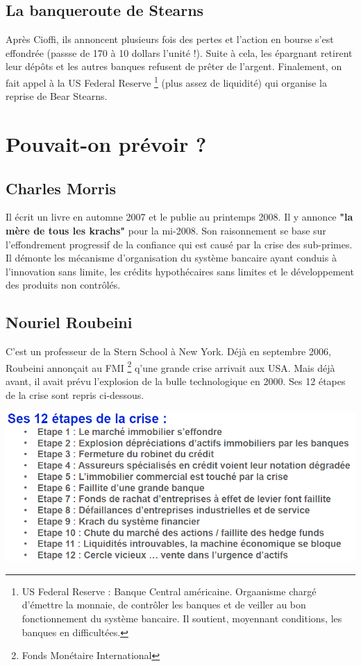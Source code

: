 \subsection{La banqueroute de Stearns}
Après Cioffi, ils annoncent plusieurs fois des pertes et l'action en bourse s'est effondrée (passse de 170 à 10 dollars l'unité !). Suite à cela, les épargnant retirent leur dépôts et les autres banques refusent de prêter de l'argent. Finalement, on fait appel à la US Federal Reserve \footnote{US Federal Reserve : Banque Central américaine. Orgaanisme chargé d'émettre la monnaie, de contrôler les banques et de veiller au bon fonctionnement du système bancaire. Il soutient, moyennant conditions, les banques en difficultées.} (plus assez de liquidité) qui organise la reprise de Bear Stearns.

\section{Pouvait-on prévoir ?}
\subsection{Charles Morris}
Il écrit un livre en automne 2007 et le publie au printemps 2008. Il y annonce \textbf{"la mère de tous les krachs"} pour la mi-2008. Son raisonnement se base sur l'effondrement progressif de la confiance qui est causé par la crise des sub-primes. Il démonte les mécanisme d'organisation du système bancaire ayant conduis à l'innovation sans limite, les crédits hypothécaires sans limites et le développement des produits non contrôlés.

\subsection{Nouriel Roubeini}
C'est un professeur de la Stern School à New York. Déjà en septembre 2006, Roubeini annonçait au FMI \footnote{Fonds Monétaire International} q'une grande crise arrivait aux USA. Mais déjà avant, il avait prévu l'explosion de la bulle technologique en 2000. Ses 12 étapes de la crise sont repris ci-dessous.  
\begin{center}
\includegraphics[scale=0.4]{7}
\end{center}


